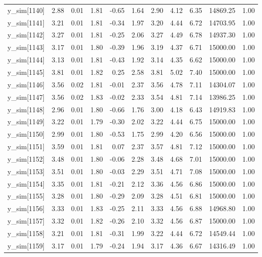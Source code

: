 \begin{table}[ht]
\begin{tabular}{rrrrrrrrrrr}
  y\_sim[1140] & 2.88 & 0.01 & 1.81 & -0.65 & 1.64 & 2.90 & 4.12 & 6.35 & 14869.25 & 1.00 \\ 
  y\_sim[1141] & 3.21 & 0.01 & 1.81 & -0.34 & 1.97 & 3.20 & 4.44 & 6.72 & 14703.95 & 1.00 \\ 
  y\_sim[1142] & 3.27 & 0.01 & 1.81 & -0.25 & 2.06 & 3.27 & 4.49 & 6.78 & 14937.30 & 1.00 \\ 
  y\_sim[1143] & 3.17 & 0.01 & 1.80 & -0.39 & 1.96 & 3.19 & 4.37 & 6.71 & 15000.00 & 1.00 \\ 
  y\_sim[1144] & 3.13 & 0.01 & 1.81 & -0.43 & 1.92 & 3.14 & 4.35 & 6.62 & 15000.00 & 1.00 \\ 
  y\_sim[1145] & 3.81 & 0.01 & 1.82 & 0.25 & 2.58 & 3.81 & 5.02 & 7.40 & 15000.00 & 1.00 \\ 
  y\_sim[1146] & 3.56 & 0.02 & 1.81 & -0.01 & 2.37 & 3.56 & 4.78 & 7.11 & 14304.07 & 1.00 \\ 
  y\_sim[1147] & 3.56 & 0.02 & 1.83 & -0.02 & 2.33 & 3.54 & 4.81 & 7.14 & 13986.25 & 1.00 \\ 
  y\_sim[1148] & 2.96 & 0.01 & 1.80 & -0.66 & 1.76 & 3.00 & 4.18 & 6.43 & 14919.83 & 1.00 \\ 
  y\_sim[1149] & 3.22 & 0.01 & 1.79 & -0.30 & 2.02 & 3.22 & 4.44 & 6.75 & 15000.00 & 1.00 \\ 
  y\_sim[1150] & 2.99 & 0.01 & 1.80 & -0.53 & 1.75 & 2.99 & 4.20 & 6.56 & 15000.00 & 1.00 \\ 
  y\_sim[1151] & 3.59 & 0.01 & 1.81 & 0.07 & 2.37 & 3.57 & 4.81 & 7.12 & 15000.00 & 1.00 \\ 
  y\_sim[1152] & 3.48 & 0.01 & 1.80 & -0.06 & 2.28 & 3.48 & 4.68 & 7.01 & 15000.00 & 1.00 \\ 
  y\_sim[1153] & 3.51 & 0.01 & 1.80 & -0.03 & 2.29 & 3.51 & 4.71 & 7.08 & 15000.00 & 1.00 \\ 
  y\_sim[1154] & 3.35 & 0.01 & 1.81 & -0.21 & 2.12 & 3.36 & 4.56 & 6.86 & 15000.00 & 1.00 \\ 
  y\_sim[1155] & 3.28 & 0.01 & 1.80 & -0.29 & 2.09 & 3.28 & 4.51 & 6.81 & 15000.00 & 1.00 \\ 
  y\_sim[1156] & 3.33 & 0.01 & 1.83 & -0.25 & 2.11 & 3.33 & 4.56 & 6.88 & 14968.80 & 1.00 \\ 
  y\_sim[1157] & 3.32 & 0.01 & 1.82 & -0.26 & 2.10 & 3.32 & 4.56 & 6.87 & 15000.00 & 1.00 \\ 
  y\_sim[1158] & 3.21 & 0.01 & 1.81 & -0.31 & 1.99 & 3.22 & 4.44 & 6.72 & 14549.44 & 1.00 \\ 
  y\_sim[1159] & 3.17 & 0.01 & 1.79 & -0.24 & 1.94 & 3.17 & 4.36 & 6.67 & 14316.49 & 1.00 \\ 

\end{tabular}
\end{table}
